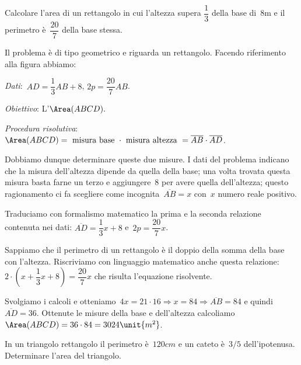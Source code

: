 \begin{problema}
 Calcolare l'area di un rettangolo in cui
l'altezza supera $\dfrac{1}{3}$ della base di~8m e il
perimetro è~$\dfrac{20}{7}$ della base stessa.
\end{problema}

\begin{soluzione}
 Il problema è di tipo geometrico e riguarda un rettangolo. Facendo riferimento 
alla figura abbiamo:
\begin{multicols}{2}
 \emph{Dati}:~$AD=\dfrac{1}{3}AB+8$, $2p=\dfrac{20}{7}AB$.

\emph{Obiettivo}: L'$\Area (ABCD).$

\begin{center}
 
\end{center}
\end{multicols}

\emph{Procedura risolutiva}:
$\Area (ABCD)=\text{ misura base }\cdot \text{ misura altezza 
}=\overline{AB}\cdot \overline{AD}$.

Dobbiamo dunque determinare queste due misure. I dati del problema
indicano che la misura dell'altezza dipende da quella
della base; una volta trovata questa misura basta farne un terzo e
aggiungere~8 per avere quella dell'altezza; questo
ragionamento ci fa scegliere come incognita~$\overline{AB}=x$
con~$x$ numero reale positivo.

Traduciamo con formalismo matematico la prima e la seconda relazione
contenuta nei dati:
$\overline{AD}=\dfrac{1}{3}x+8$ e~$2p=\dfrac{20}{7}x$.

Sappiamo che il perimetro di un rettangolo è il doppio della somma
della base con l'altezza. Riscriviamo con linguaggio
matematico anche questa relazione:~$2\cdot 
\left(x+\dfrac{1}{3}x+8\right)=\dfrac{20}{7}x$
che risulta l'equazione risolvente.

Svolgiamo i calcoli e otteniamo~$4x=21\cdot 16\Rightarrow 
x=84\Rightarrow\overline{AB}=84$ e quindi~$\overline{AD}=36$.
Ottenute le misure della base e dell'altezza calcoliamo~$\Area (ABCD)=36\cdot 
84=3024\unit{{m}^{2}}$.
\end{soluzione}

\begin{problema}
In un triangolo rettangolo il perimetro è~$120\unit{cm}$ e un cateto è~$3/5$
dell'ipotenusa. Determinare l'area del
triangolo.
\end{problema}

